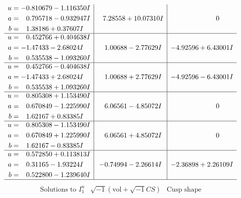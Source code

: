 \documentclass[1p]{elsarticle_modified}
\theoremstyle{definition}
\newcommand{\I}{\sqrt{-1}}
\begin{document}
$$\begin{array}{c|c|c}
\begin{aligned}
u &= -0.810679 - 1.116350 I \\
a &= \phantom{-}0.795718 - 0.932947 I \\
b &= \phantom{-}1.38186 + 0.37607 I\end{aligned}
 & \phantom{-}7.28558 + 10.07310 I & \phantom{-0.000000 } 0 \\ \hline\begin{aligned}
u &= \phantom{-}0.452766 + 0.404638 I \\
a &= -1.47433 - 2.68024 I \\
b &= \phantom{-}0.535538 - 1.093260 I\end{aligned}
 & \phantom{-}1.00688 - 2.77629 I & -4.92596 + 6.43001 I \\ \hline\begin{aligned}
u &= \phantom{-}0.452766 - 0.404638 I \\
a &= -1.47433 + 2.68024 I \\
b &= \phantom{-}0.535538 + 1.093260 I\end{aligned}
 & \phantom{-}1.00688 + 2.77629 I & -4.92596 - 6.43001 I \\ \hline\begin{aligned}
u &= \phantom{-}0.805308 + 1.153490 I \\
a &= \phantom{-}0.670849 - 1.225990 I \\
b &= \phantom{-}1.62167 + 0.83385 I\end{aligned}
 & \phantom{-}6.06561 - 4.85072 I & \phantom{-0.000000 } 0 \\ \hline\begin{aligned}
u &= \phantom{-}0.805308 - 1.153490 I \\
a &= \phantom{-}0.670849 + 1.225990 I \\
b &= \phantom{-}1.62167 - 0.83385 I\end{aligned}
 & \phantom{-}6.06561 + 4.85072 I & \phantom{-0.000000 } 0 \\ \hline\begin{aligned}
u &= \phantom{-}0.572850 + 0.113813 I \\
a &= \phantom{-}0.31165 - 1.93224 I \\
b &= \phantom{-}0.522800 - 1.239640 I\end{aligned}
 & -0.74994 - 2.26614 I & -2.36898 + 2.26109 I\\
 \hline 
 \end{array}$$\newpage$$\begin{array}{c|c|c}  
\text{Solutions to }I^u_{1}& \I (\text{vol} + \sqrt{-1}CS) & \text{Cusp shape}\\

\end{array}$$
\end{document}
